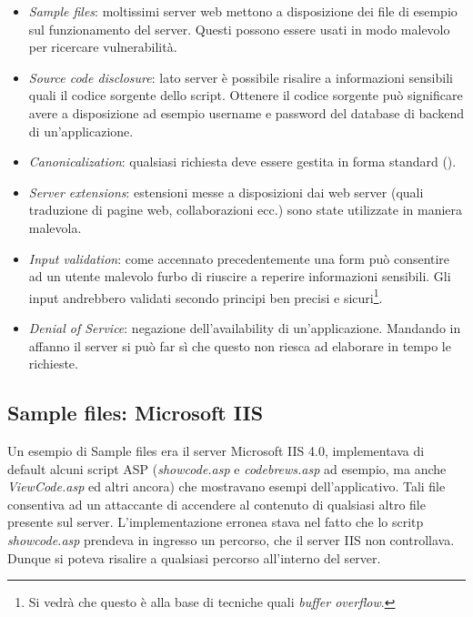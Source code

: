 \documentclass[14pt]{extreport}
\begin{document}
\begin{itemize}
    \item \textit{Sample files}: moltissimi server web mettono a disposizione dei file di esempio sul funzionamento del server. Questi possono essere usati in modo malevolo per ricercare vulnerabilità.
    
    
    \item \textit{Source code disclosure}: lato server è possibile risalire a informazioni sensibili quali il codice sorgente dello script. Ottenere il codice sorgente può significare avere a disposizione ad esempio username e password del database di backend di un'applicazione.
    
    
    \item \textit{Canonicalization}: qualsiasi richiesta deve essere gestita in forma standard ().
    
    
    \item \textit{Server extensions}: estensioni messe a disposizioni dai web server (quali traduzione di pagine web, collaborazioni ecc.) sono state utilizzate in maniera malevola.
    
    \item \textit{Input validation}: come accennato precedentemente una form può consentire ad un utente malevolo furbo di riuscire a reperire informazioni sensibili. Gli input andrebbero validati secondo principi ben precisi e sicuri\footnote{Si vedrà che questo è alla base di tecniche quali \textit{buffer overflow}.}.
    
    
    \item \textit{Denial of Service}: negazione dell'availability di un'applicazione. Mandando in affanno il server si può far sì che questo non riesca ad elaborare in tempo le richieste.
\end{itemize}



\subsection{Sample files: Microsoft IIS}


Un esempio di Sample files era il server Microsoft IIS 4.0, implementava di default alcuni script ASP (\textit{showcode.asp} e \textit{codebrews.asp} ad esempio, ma anche \textit{ViewCode.asp} ed altri ancora) che mostravano esempi dell'applicativo. Tali file consentiva ad un attaccante di accendere al contenuto di qualsiasi altro file presente sul server. L'implementazione erronea stava nel fatto che lo scritp \textit{showcode.asp} prendeva in ingresso un percorso, che il server IIS non controllava. Dunque si poteva risalire a qualsiasi percorso all'interno del server.
\end{document}
